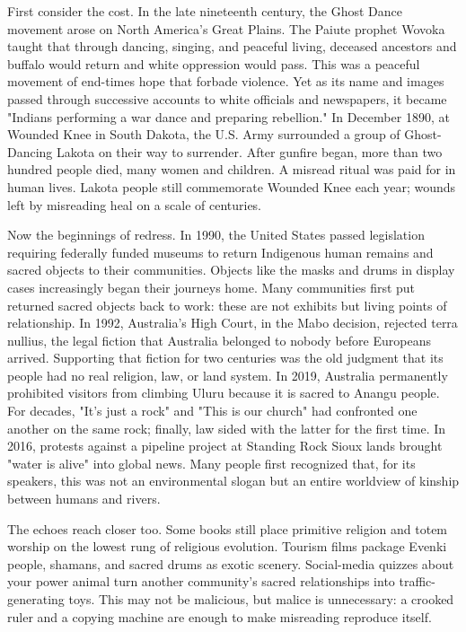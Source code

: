 First consider the cost. In the late nineteenth century, the Ghost Dance movement arose on North America's Great Plains. The Paiute prophet Wovoka taught that through dancing, singing, and peaceful living, deceased ancestors and buffalo would return and white oppression would pass. This was a peaceful movement of end-times hope that forbade violence. Yet as its name and images passed through successive accounts to white officials and newspapers, it became "Indians performing a war dance and preparing rebellion." In December 1890, at Wounded Knee in South Dakota, the U.S. Army surrounded a group of Ghost-Dancing Lakota on their way to surrender. After gunfire began, more than two hundred people died, many women and children. A misread ritual was paid for in human lives. Lakota people still commemorate Wounded Knee each year; wounds left by misreading heal on a scale of centuries.

Now the beginnings of redress. In 1990, the United States passed legislation requiring federally funded museums to return Indigenous human remains and sacred objects to their communities. Objects like the masks and drums in display cases increasingly began their journeys home. Many communities first put returned sacred objects back to work: these are not exhibits but living points of relationship. In 1992, Australia's High Court, in the Mabo decision, rejected terra nullius, the legal fiction that Australia belonged to nobody before Europeans arrived. Supporting that fiction for two centuries was the old judgment that its people had no real religion, law, or land system. In 2019, Australia permanently prohibited visitors from climbing Uluru because it is sacred to Anangu people. For decades, "It's just a rock" and "This is our church" had confronted one another on the same rock; finally, law sided with the latter for the first time. In 2016, protests against a pipeline project at Standing Rock Sioux lands brought "water is alive" into global news. Many people first recognized that, for its speakers, this was not an environmental slogan but an entire worldview of kinship between humans and rivers.

The echoes reach closer too. Some books still place primitive religion and totem worship on the lowest rung of religious evolution. Tourism films package Evenki people, shamans, and sacred drums as exotic scenery. Social-media quizzes about your power animal turn another community's sacred relationships into traffic-generating toys. This may not be malicious, but malice is unnecessary: a crooked ruler and a copying machine are enough to make misreading reproduce itself.

